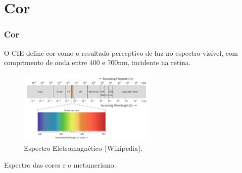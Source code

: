\section{Cor}

\begin{frame}[allowframebreaks]
  \frametitle{Cor}
  O CIE define cor como o resultado perceptivo de luz no espectro visível, com comprimento de onda
  entre 400 e 700nm, incidente na retina. 

  \begin{figure}[h!]
  \centering
  \includegraphics[width=0.6\textwidth]{images/emspectrum.pdf}
  \caption{Espectro Eletromagnético (Wikipedia).} 
  \label{fig:emspectrum}
  \end{figure}
 
  \framebreak

  Espectro das cores e o metamerismo.


\end{frame}
